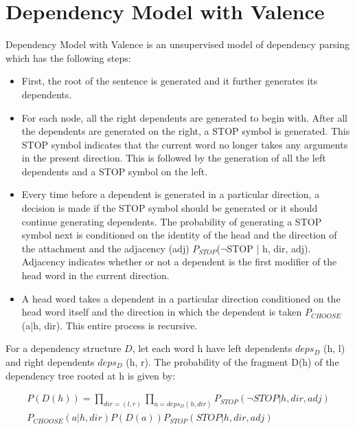 \documentclass{article}
\begin{document}
\section{Dependency Model with Valence}

Dependency Model with Valence is an unsupervised model of dependency parsing which has the following steps:

\begin{itemize}

\item First, the root of the sentence is generated and it further generates its dependents.

\item For each node, all the right dependents are generated to begin with. After all the dependents are generated on the right, a STOP symbol is generated. This STOP symbol indicates that the current word no longer takes any arguments in the present direction. This is followed by the generation of all the left dependents and a STOP symbol on the left. 

\item Every time before a dependent is generated in a particular direction, a decision is made if the STOP symbol should be generated or it should continue generating dependents. The probability of generating a STOP symbol next is conditioned on the identity of the head and the direction of the attachment and the adjacency (adj) $P_{STOP}$($\neg$STOP | h, dir, adj). Adjacency indicates whether or not a dependent is the first modifier of the head word in the current direction.

\item A head word takes a dependent in a particular direction conditioned on the head word itself and the direction in which the dependent is taken $P_{CHOOSE}$(a|h, dir). This entire process is recursive.

\end{itemize}

For a dependency structure $D$, let each word h have left dependents $deps_D$ (h, l) and right dependents $deps_D$ (h, r). The probability of the fragment D(h) of the dependency tree rooted at h is given by:

\begin{gather*}
    P(D(h)) = \prod\limits_{dir=(l,r)} \prod\limits_{a=deps_D(h,dir)} P_{STOP} (\neg STOP | h, dir, adj) \\
    P_{CHOOSE}(a|h, dir) P(D(a)) P_{STOP}(STOP | h, dir, adj)
\end{gather*}
\end{document}
